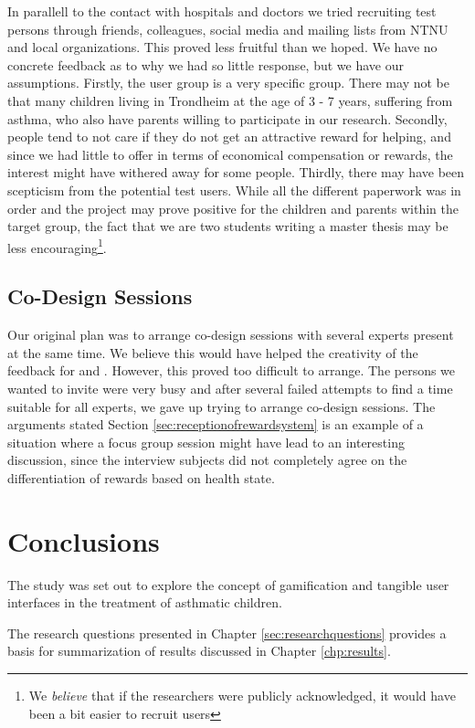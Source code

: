 In parallell to the contact with hospitals and doctors we tried recruiting test persons through friends, colleagues, social media and mailing lists from NTNU and local organizations. This proved less fruitful than we hoped. We have no concrete feedback as to why we had so little response, but we have our assumptions. Firstly, the user group is a very specific group. There may not be that many children living in Trondheim at the age of 3 - 7 years, suffering from asthma, who also have parents willing to participate in our research. Secondly, people tend to not care if they do not get an attractive reward for helping, and since we had little to offer in terms of economical compensation or rewards, the interest might have withered away for some people. Thirdly, there may have been scepticism from the potential test users. While all the different paperwork was in order and the project may prove positive for the children and parents within the target group, the fact that we are two students writing a master thesis may be less encouraging\footnote{We \emph{believe} that if the researchers were publicly acknowledged, it would have been a bit easier to recruit users}.


\subsection{Co-Design Sessions}
\label{sec:codesignsessionsdifficulties}
Our original plan was to arrange co-design sessions with several experts present at the same time. We believe this would have helped the creativity of the feedback for \app{} and \ab{}. However, this proved too difficult to arrange. The persons we wanted to invite were very busy and after several failed attempts to find a time suitable for all experts, we gave up trying to arrange co-design sessions. The arguments stated Section \ref{sec:receptionofrewardsystem} is an example of a situation where a focus group session might have lead to an interesting discussion, since the interview subjects did not completely agree on the differentiation of rewards based on health state.

  
\section{Conclusions}
\label{conlusions}

The study was set out to explore the concept of gamification and tangible user interfaces in the treatment of asthmatic children.

The research questions presented in Chapter \ref{sec:researchquestions} provides a basis for summarization of results discussed in Chapter \ref{chp:results}. 


